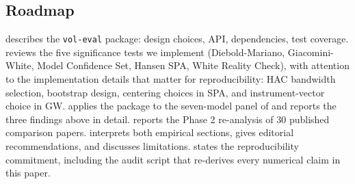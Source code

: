 \subsection{Roadmap}

 describes the \texttt{vol-eval} package: design choices, API, dependencies, test coverage.  reviews the five significance tests we implement (Diebold-Mariano, Giacomini-White, Model Confidence Set, Hansen SPA, White Reality Check), with attention to the implementation details that matter for reproducibility: HAC bandwidth selection, bootstrap design, centering choices in SPA, and instrument-vector choice in GW.  applies the package to the seven-model panel of \citet{KhanVol2026} and reports the three findings above in detail.  reports the Phase 2 re-analysis of 30 published comparison papers.  interprets both empirical sections, gives editorial recommendations, and discusses limitations.  states the reproducibility commitment, including the audit script that re-derives every numerical claim in this paper.
